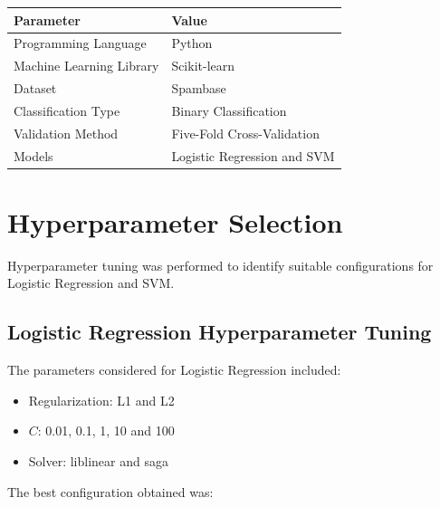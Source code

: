 \documentclass[12pt,a4paper]{article}
\begin{document}
\begin{longtable}{|p{6cm}|p{8cm}|}
\hline
\textbf{Parameter} & \textbf{Value} \\ \hline

Programming Language & Python \\ \hline

Machine Learning Library & Scikit-learn \\ \hline

Dataset & Spambase \\ \hline

Classification Type & Binary Classification \\ \hline

Validation Method & Five-Fold Cross-Validation \\ \hline

Models & Logistic Regression and SVM \\ \hline

\end{longtable}


\section{Hyperparameter Selection}

Hyperparameter tuning was performed to identify suitable configurations
for Logistic Regression and SVM.


\subsection{Logistic Regression Hyperparameter Tuning}

The parameters considered for Logistic Regression included:

\begin{itemize}
    \item Regularization: L1 and L2
    \item $C$: 0.01, 0.1, 1, 10 and 100
    \item Solver: liblinear and saga
\end{itemize}

The best configuration obtained was:
\end{document}
